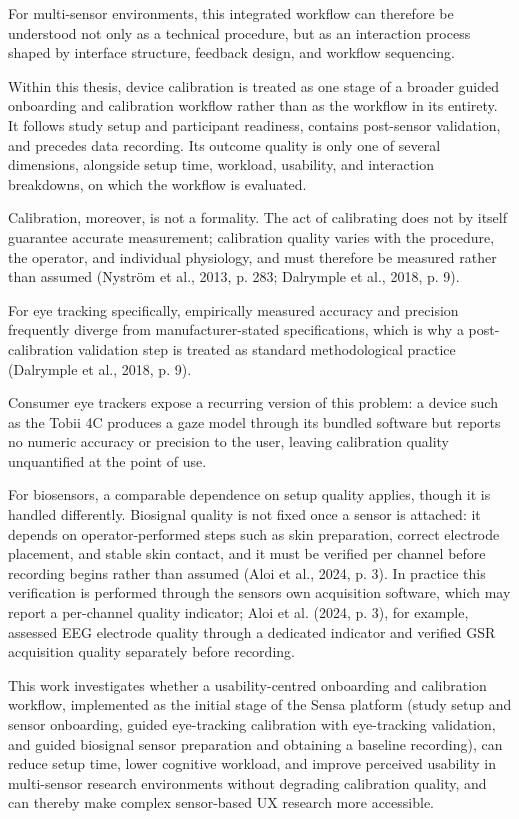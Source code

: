 \documentclass[
]{article}
\begin{document}
For multi-sensor environments, this integrated workflow can therefore be understood not only as a technical procedure, but as an interaction process shaped by interface structure, feedback design, and workflow sequencing.

Within this thesis, device calibration is treated as one stage of a broader guided onboarding and calibration workflow rather than as the workflow in its entirety. It follows study setup and participant readiness, contains post-sensor validation, and precedes data recording. Its outcome quality is only one of several dimensions, alongside setup time, workload, usability, and interaction breakdowns, on which the workflow is evaluated.

Calibration, moreover, is not a formality. The act of calibrating does not by itself guarantee accurate measurement; calibration quality varies with the procedure, the operator, and individual physiology, and must therefore be measured rather than assumed (Nyström et al., 2013, p. 283; Dalrymple et al., 2018, p. 9).

For eye tracking specifically, empirically measured accuracy and precision frequently diverge from manufacturer-stated specifications, which is why a post-calibration validation step is treated as standard methodological practice (Dalrymple et al., 2018, p. 9).

Consumer eye trackers expose a recurring version of this problem: a device such as the Tobii 4C produces a gaze model through its bundled software but reports no numeric accuracy or precision to the user, leaving calibration quality unquantified at the point of use.

For biosensors, a comparable dependence on setup quality applies, though it is handled differently. Biosignal quality is not fixed once a sensor is attached: it depends on operator-performed steps such as skin preparation, correct electrode placement, and stable skin contact, and it must be verified per channel before recording begins rather than assumed (Aloi et al., 2024, p. 3). In practice this verification is performed through the sensor\textquotesingle s own acquisition software, which may report a per-channel quality indicator; Aloi et al. (2024, p. 3), for example, assessed EEG electrode quality through a dedicated indicator and verified GSR acquisition quality separately before recording.

This work investigates whether a usability-centred onboarding and calibration workflow, implemented as the initial stage of the Sensa platform (study setup and sensor onboarding, guided eye-tracking calibration with eye-tracking validation, and guided biosignal sensor preparation and obtaining a baseline recording), can reduce setup time, lower cognitive workload, and improve perceived usability in multi-sensor research environments without degrading calibration quality, and can thereby make complex sensor-based UX research more accessible.
\end{document}
